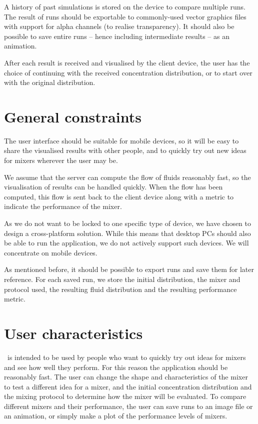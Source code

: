 A history of past simulations is stored on the device to compare multiple runs. The result of runs should be exportable to commonly-used vector graphics files with support for alpha channels (to realise transparency). It should also be possible to save entire runs -- hence including intermediate results -- as an animation.

After each result is received and visualised by the client device, the user has the choice of continuing with the received concentration distribution, or to start over with the original distribution.

\section{General constraints}
The user interface should be suitable for mobile devices, so it will be easy to share the visualised results with other people, and to quickly try out new ideas for mixers wherever the user may be.
 
We assume that the server can compute the flow of fluids reasonably fast, so the visualisation of results can be handled quickly. When the flow has been computed, this flow is sent back to the client device along with a metric to indicate the performance of the mixer. 
 
As we do not want to be locked to one specific type of device, we have chosen to design a cross-platform solution. While this means that desktop PCs should also be able to run the application, we do not actively support such devices. We will concentrate on mobile devices.

As mentioned before, it should be possible to export runs and save them for later reference. For each saved run, we store the initial distribution, the mixer and protocol used, the resulting fluid distribution and the resulting performance metric.

\section{User characteristics}
\projectname\ is intended to be used by people who want to quickly try out ideas for mixers and see how well they perform. For this reason the application should be reasonably fast. The user can change the shape and characteristics of the mixer to test a different idea for a mixer, and the initial concentration distribution and the mixing protocol to determine how the mixer will be evaluated. To compare different mixers and their performance, the user can save runs to an image file or an animation, or simply make a plot of the performance levels of mixers.

